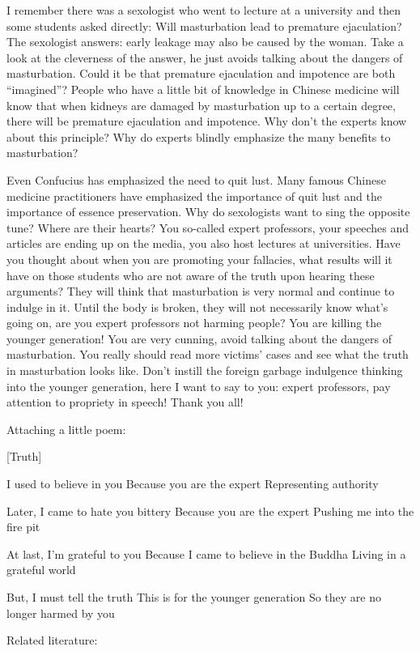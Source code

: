 \documentclass[
]{book}
\begin{document}
I remember there was a sexologist who went to lecture at a university and then some students asked directly: Will masturbation lead to premature ejaculation? The sexologist answers: early leakage may also be caused by the woman. Take a look at the cleverness of the answer, he just avoids talking about the dangers of masturbation. Could it be that premature ejaculation and impotence are both ``imagined''? People who have a little bit of knowledge in Chinese medicine will know that when kidneys are damaged by masturbation up to a certain degree, there will be premature ejaculation and impotence. Why don't the experts know about this principle? Why do experts blindly emphasize the many benefits to masturbation?

Even Confucius has emphasized the need to quit lust. Many famous Chinese medicine practitioners have emphasized the importance of quit lust and the importance of essence preservation. Why do sexologists want to sing the opposite tune? Where are their hearts? You so-called expert professors, your speeches and articles are ending up on the media, you also host lectures at universities. Have you thought about when you are promoting your fallacies, what results will it have on those students who are not aware of the truth upon hearing these arguments? They will think that masturbation is very normal and continue to indulge in it. Until the body is broken, they will not necessarily know what's going on, are you expert professors not harming people? You are killing the younger generation! You are very cunning, avoid talking about the dangers of masturbation. You really should read more victims' cases and see what the truth in masturbation looks like. Don't instill the foreign garbage indulgence thinking into the younger generation, here I want to say to you: expert professors, pay attention to propriety in speech! Thank you all!

Attaching a little poem:

{[}Truth{]}

I used to believe in you
Because you are the expert
Representing authority

Later, I came to hate you bittery
Because you are the expert
Pushing me into the fire pit

At last, I'm grateful to you
Because I came to believe in the Buddha
Living in a grateful world

But, I must tell the truth
This is for the younger generation
So they are no longer harmed by you

Related literature:
\end{document}
